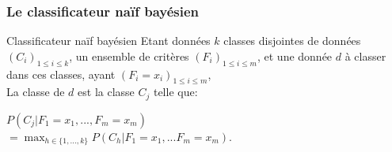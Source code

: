 \documentclass{beamer}
\begin{document}
\begin{frame}
\frametitle{Le classificateur naïf bayésien}

\begin{block}{Classificateur naïf bayésien}
Etant données $k$ classes disjointes de données $(C_{i})_{1 \le i \le k}$, un ensemble de critères $(F_{i})_{1 \le i \le m}$, et une donnée $d$ à classer dans ces classes, ayant $(F_{i} = x_{i})_{1 \le i \le m}$,\\ La classe de $d$ est la classe $C_{j}$ telle que:\\
\begin{center}
$P(C_{j} | F_{1} = x_{1}, ..., F_{m} = x_{m})$\\
$= \max_{h \in \{ 1, ..., k \}}P(C_{h} | F_{1} = x_{1}, ... F_{m} = x_{m})$.\\
\end{center}
\end{block}



\end{frame}
\end{document}
